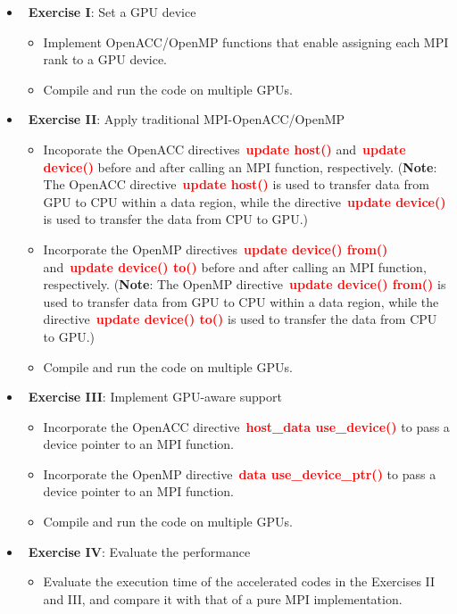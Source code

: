\begin{itemize}
    \item~\textbf{Exercise I}: Set a GPU device
    \begin{itemize}
        \item Implement OpenACC/OpenMP functions that enable assigning each MPI rank to a GPU device.
        \item Compile and run the code on multiple GPUs.
    \end{itemize}
    \item~\textbf{Exercise II}: Apply traditional MPI-OpenACC/OpenMP
    \begin{itemize}
        \item Incoporate the OpenACC directives~\textbf{\textcolor{red}{update host()}} and~\textbf{\textcolor{red}{update device()}} before and after calling an MPI function, respectively. (\textbf{Note}: The OpenACC directive~\textbf{\textcolor{red}{update host()}} is used to transfer data from GPU to CPU within a data region, while the directive~\textbf{\textcolor{red}{update device()}} is used to transfer the data from CPU to GPU.)
        \item Incorporate the OpenMP directives~\textbf{\textcolor{red}{update device() from()}} and~\textbf{\textcolor{red}{update device() to()}} before and after calling an MPI function, respectively. (\textbf{Note}: The OpenMP directive~\textbf{\textcolor{red}{update device() from()}} is used to transfer data from GPU to CPU within a data region, while the directive~\textbf{\textcolor{red}{update device() to()}} is used to transfer the data from CPU to GPU.)
        \item Compile and run the code on multiple GPUs.
    \end{itemize}
    \item~\textbf{Exercise III}: Implement GPU-aware support
    \begin{itemize}
        \item Incorporate the OpenACC directive~\textbf{\textcolor{red}{host\_data use\_device()}} to pass a device pointer to an MPI function.
        \item Incorporate the OpenMP directive~\textbf{\textcolor{red}{data use\_device\_ptr()}} to pass a device pointer to an MPI function.
        \item Compile and run the code on multiple GPUs.
    \end{itemize}
    \item~\textbf{Exercise IV}: Evaluate the performance
    \begin{itemize}
        \item Evaluate the execution time of the accelerated codes in the Exercises II and III, and compare it with that of a pure MPI implementation.
    \end{itemize}
\end{itemize}


